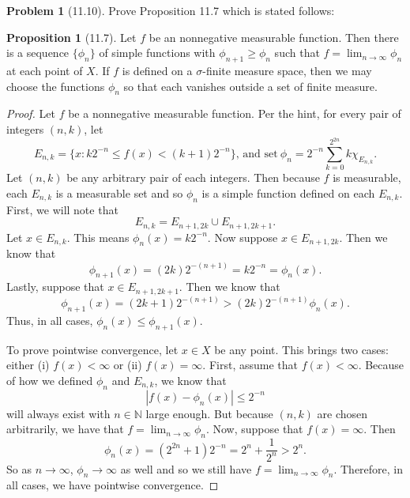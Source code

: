 \documentclass[12pt]{article}
\newcommand{\N}{\mathbb{N}}
\newcommand{\abs}[1]{\left\lvert #1 \right\rvert}
\theoremstyle{definition}
\newtheorem{problem}{Problem}
\newtheorem*{prop}{Proposition}
\begin{document}
\begin{problem}[11.10]

    Prove Proposition 11.7 which is stated follows:
\begin{prop}[11.7]
Let \( f \) be an nonnegative measurable function. 
Then there is a sequence \( \{\phi_n\} \) of simple functions with \( \phi_{n+1} \geq \phi_n \) such that \( \displaystyle f = \lim_{n \to \infty} \phi_n \) at each point of \( X \). If \( f \) is defined on a  \( \sigma \)-finite measure space, then we may choose the functions \( \phi_n \) so that each vanishes outside a set of finite measure.
    \begin{proof}
        Let \( f \) be a nonnegative measurable function. Per the hint, for every pair of integers \( (n,k) \), let 
            \[
                E_{n,k} = \{ x: k 2^{-n} \leq f(x) < (k+1)2^{-n} \}, \, \text{and set} \ \phi_n = 2^{-n} \sum_{k=0}^{2^{2n}} k \chi_{E_{n,k}}.
            \]
        Let \( (n,k) \) be any arbitrary pair of each integers. 
        Then because \( f \) is measurable, each \( E_{n,k} \) is a measurable set and so \( \phi_n \) is a simple function defined on each \( E_{n,k} \).
            First, we will note that
            \[
                E_{n,k} = E_{n+1, 2k} \cup E_{n+1, 2k+1}.
            \]  
            Let \( x \in E_{n,k} \). This means \( \phi_n(x) = k 2^{-n} \). 
            Now suppose \( x \in E_{n+1, 2k} \).
            Then we know that 
                \[
                    \phi_{n+1}(x) = (2k)2^{-(n+1)} = k2^{-n} = \phi_n(x). 
                \]
            Lastly, suppose that \( x \in E_{n+1, 2k+1} \). Then we know that
                \[
                    \phi_{n+1}(x) = (2k+1) 2^{-(n+1)} > (2k)2^{-(n+1)} \phi_n(x). 
                \]
            Thus, in all cases, \( \phi_n(x) \leq \phi_{n+1}(x) \).
            
            To prove pointwise convergence, let \( x \in X \) be any point. This brings two cases: either (i) \( f(x) < \infty\) or (ii) \( f(x) = \infty \).
            First, assume that \( f(x) < \infty \). Because of how we defined \( \phi_n \) and \( E_{n,k} \), we know that
                \[
                    \abs{f(x) - \phi_n(x)} \leq 2^{-n}  
                \]
            will always exist with \( n \in \N \) large enough. 
            But because \( (n,k) \) are chosen arbitrarily, we have that \( \displaystyle f = \lim_{n \to \infty} \phi_n \).
            Now, suppose that \( f(x) = \infty \). Then 
                \[
                    \phi_n(x) = (2^{2n} + 1)2^{-n} = 2^{n} + \frac{1}{2^{n}} > 2^{n}. 
                \]
            So as \( n \to \infty\), \( \phi_n \to \infty \) as well and so we still have \( \displaystyle f = \lim_{n \to \infty} \phi_n \). Therefore, in all cases, we have pointwise convergence. 
            


\end{proof}
\end{prop}
\end{problem}
\end{document}
